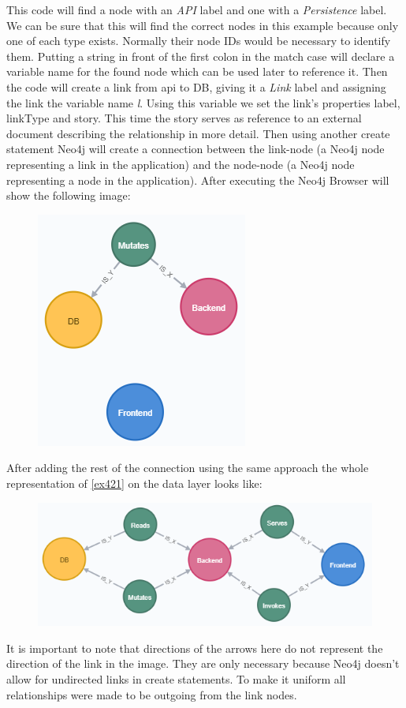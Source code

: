 This code will find a node with an \emph{API} label and one with a \emph{Persistence} label. We can be sure that this will find the correct nodes in this example because only one of each type exists. Normally their node IDs would be necessary to identify them. Putting a string in front of the first colon in the match case will declare a variable name for the found node which can be used later to reference it. Then the code will create a link from api to DB, giving it a \emph{Link} label and assigning the link the variable name \emph{l}. Using this variable we set the link's properties label, linkType and story. This time the story serves as reference to an external document describing the relationship in more detail. Then using another create statement Neo4j will create a connection between the link-node (a Neo4j node representing a link in the application) and the node-node (a Neo4j node representing a node in the application). After executing the Neo4j Browser will show the following image:
\begin{figure}[H]
\centering
\includegraphics[scale=1]{Bilder/BasicGraphNeo2.png}
\label{ex423}
\end{figure}

After adding the rest of the connection using the same approach the whole representation of \autoref{ex421} on the data layer looks like:
\begin{figure}[H]
\centering
\includegraphics[scale=1]{Bilder/BasicGraphNeo3.png}
\label{ex424}
\end{figure}
It is important to note that directions of the arrows here do not represent the direction of the link in the image. They are only necessary because Neo4j doesn't allow for undirected links in create statements. To make it uniform all relationships were made to be outgoing from the link nodes.

